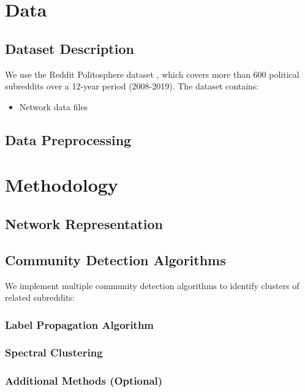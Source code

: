 \documentclass{article}
\begin{document}
\section{Data}
\subsection{Dataset Description}
We use the Reddit Politosphere dataset \cite{Hofmann_Schütze_Pierrehumbert_2022}, which covers more than 600 political subreddits over a 12-year period (2008-2019). The dataset contains:
\begin{itemize}
    \item Network data files 
\end{itemize}

\subsection{Data Preprocessing}

\section{Methodology}
\subsection{Network Representation}

\subsection{Community Detection Algorithms}
We implement multiple community detection algorithms to identify clusters of related subreddits:

\subsubsection{Label Propagation Algorithm}

\subsubsection{Spectral Clustering}

\subsubsection{Additional Methods (Optional)}
\end{document}
